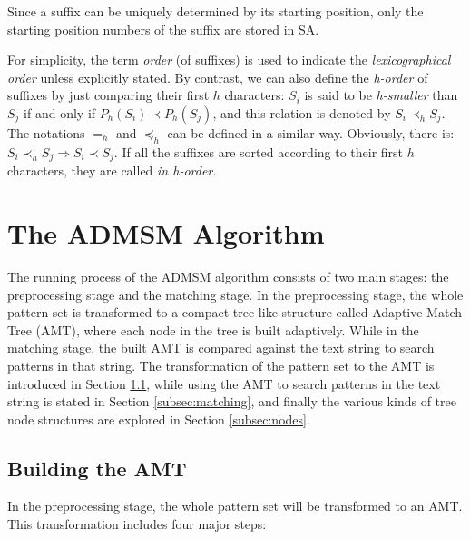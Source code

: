 \documentclass[legalpaper]{article}
\begin{document}
Since a suffix can be uniquely determined by its starting position,
only the starting position numbers of the suffix are stored in SA.

For simplicity, the term \emph{order} (of suffixes) is used to
indicate the \emph{lexicographical order} unless explicitly stated. By
contrast, we can also define the \emph{h-order} of suffixes by just
comparing their first $h$ characters: $S_i$ is said to be
\emph{h-smaller} than $S_j$ if and only if $P_h(S_i) \prec P_h(S_j)$,
and this relation is denoted by $S_i \prec_h S_j$.  The notations
$=_h$ and $\preceq_h$ can be defined in a similar way.  Obviously,
there is: $S_i \prec_h S_j \Longrightarrow S_i \prec S_j$. If all the
suffixes are sorted according to their first $h$ characters, they are
called \emph{in h-order}.

\section{The ADMSM Algorithm}
\label{sec:ADSM}

The running process of the ADMSM algorithm consists of two main
stages: the preprocessing stage and the matching stage. In the
preprocessing stage, the whole pattern set is transformed to a compact
tree-like structure called \textsf{Adaptive Match Tree}
(\textsf{AMT}), where each node in the tree is built adaptively. While
in the matching stage, the built \textsf{AMT} is compared against the
text string to search patterns in that string.  The transformation of
the pattern set to the \textsf{AMT} is introduced in Section
\ref{subsec:preprocessing}, while using the \textsf{AMT} to search
patterns in the text string is stated in Section
\ref{subsec:matching}, and finally the various kinds of tree node
structures are explored in Section \ref{subsec:nodes}.

\subsection{Building the AMT}
\label{subsec:preprocessing}

In the preprocessing stage, the whole pattern set will be transformed
to an \textsf{AMT}. This transformation includes four major steps:
\end{document}
